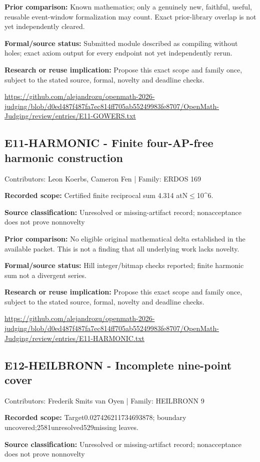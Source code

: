 \documentclass[11pt,a4paper]{article}
\begin{document}
\textbf{Prior comparison:} Known mathematics; only a genuinely new, faithful, useful, reusable event-window formalization may count. Exact prior-library overlap is not yet independently cleared.

\textbf{Formal/source status:} Submitted module described as compiling without holes; exact axiom output for every endpoint not yet independently rerun.

\textbf{Research or reuse implication:} Propose this exact scope and family once, subject to the stated source, formal, novelty and deadline checks.

{\small \url{https://github.com/alejandrozu/openmath-2026-judging/blob/d0ed487f487fa7ec814ff705ab55249983fe8707/OpenMath-Judging/review/entries/E11-GOWERS.txt}\par}

\begin{samepage}
\subsection{E11-HARMONIC  -  Finite four-AP-free harmonic construction}
{\small Contributors: Leon Koerbs, Cameron Fen | Family: ERDOS 169\par}

\textbf{Recorded scope:} Certified finite reciprocal sum 4.314 atN\ensuremath{\leq}10\textasciicircum{}6.

\end{samepage}
\textbf{Source classification:} Unresolved or missing-artifact record; nonacceptance does not prove nonnovelty

\textbf{Prior comparison:} No eligible original mathematical delta established in the available packet. This is not a finding that all underlying work lacks novelty.

\textbf{Formal/source status:} Hill integer/bitmap checks reported; finite harmonic sum not a divergent series.

\textbf{Research or reuse implication:} Propose this exact scope and family once, subject to the stated source, formal, novelty and deadline checks.

{\small \url{https://github.com/alejandrozu/openmath-2026-judging/blob/d0ed487f487fa7ec814ff705ab55249983fe8707/OpenMath-Judging/review/entries/E11-HARMONIC.txt}\par}

\begin{samepage}
\subsection{E12-HEILBRONN  -  Incomplete nine-point cover}
{\small Contributors: Frederik Smits van Oyen | Family: HEILBRONN 9\par}

\textbf{Recorded scope:} Target0.027426211734693878; boundary uncovered;2581unresolved529missing leaves.

\end{samepage}
\textbf{Source classification:} Unresolved or missing-artifact record; nonacceptance does not prove nonnovelty
\end{document}
